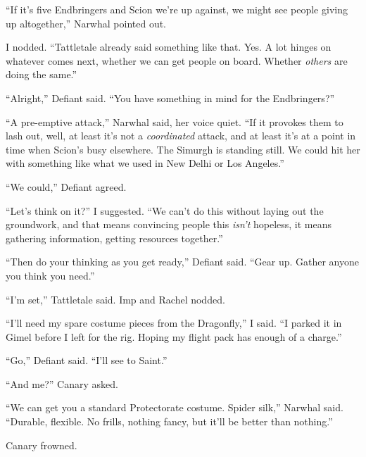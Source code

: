``If it's five Endbringers and Scion we're up against, we might see people giving up altogether,'' Narwhal pointed out.



I nodded.  ``Tattletale already said something like that.  Yes.  A lot hinges on whatever comes next, whether we can get people on board.  Whether \emph{others} are doing the same.''



``Alright,'' Defiant said.  ``You have something in mind for the Endbringers?''



``A pre-emptive attack,'' Narwhal said, her voice quiet.  ``If it provokes them to lash out, well, at least it's not a \emph{coordinated} attack, and at least it's at a point in time when Scion's busy elsewhere.  The Simurgh is standing still.  We could hit her with something like what we used in New Delhi or Los Angeles.''



``We could,'' Defiant agreed.



``Let's think on it?'' I suggested.  ``We can't do this without laying out the groundwork, and that means convincing people this \emph{isn't} hopeless, it means gathering information, getting resources together.''



``Then do your thinking as you get ready,'' Defiant said.  ``Gear up.  Gather anyone you think you need.''



``I'm set,'' Tattletale said.  Imp and Rachel nodded.



``I'll need my spare costume pieces from the Dragonfly,'' I said.  ``I parked it in Gimel before I left for the rig.  Hoping my flight pack has enough of a charge.''



``Go,'' Defiant said.  ``I'll see to Saint.''



``And me?'' Canary asked.



``We can get you a standard Protectorate costume.  Spider silk,'' Narwhal said.  ``Durable, flexible.  No frills, nothing fancy, but it'll be better than nothing.''



Canary frowned.



